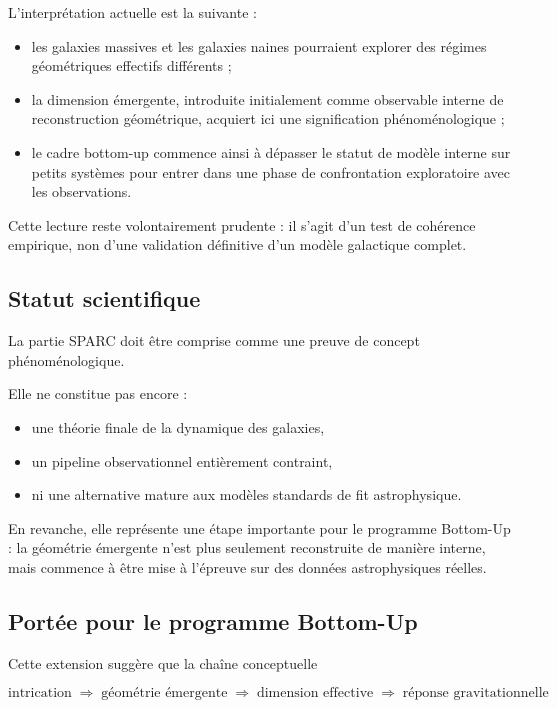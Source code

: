 \documentclass[11pt]{article}
\begin{document}
L'interprétation actuelle est la suivante :

\begin{itemize}
\item les galaxies massives et les galaxies naines pourraient explorer des régimes géométriques effectifs différents ;
\item la dimension émergente, introduite initialement comme observable interne de reconstruction géométrique, acquiert ici une signification phénoménologique ;
\item le cadre bottom-up commence ainsi à dépasser le statut de modèle interne sur petits systèmes pour entrer dans une phase de confrontation exploratoire avec les observations.
\end{itemize}

Cette lecture reste volontairement prudente : il s'agit d'un test de cohérence empirique, non d'une validation définitive d'un modèle galactique complet.

\subsection{Statut scientifique}

La partie SPARC doit être comprise comme une preuve de concept phénoménologique.

Elle ne constitue pas encore :

\begin{itemize}
\item une théorie finale de la dynamique des galaxies,
\item un pipeline observationnel entièrement contraint,
\item ni une alternative mature aux modèles standards de fit astrophysique.
\end{itemize}

En revanche, elle représente une étape importante pour le programme Bottom-Up : la géométrie émergente n'est plus seulement reconstruite de manière interne, mais commence à être mise à l'épreuve sur des données astrophysiques réelles.

\subsection{Portée pour le programme Bottom-Up}

Cette extension suggère que la chaîne conceptuelle

\[
\text{intrication}
\;\Longrightarrow\;
\text{géométrie émergente}
\;\Longrightarrow\;
\text{dimension effective}
\;\Longrightarrow\;
\text{réponse gravitationnelle}
\]
\end{document}
